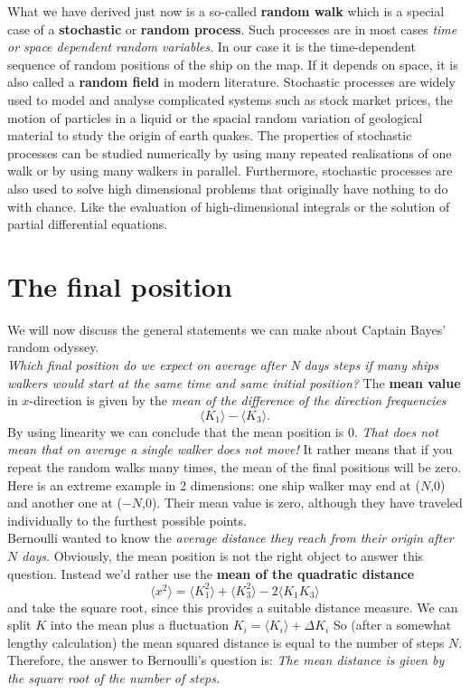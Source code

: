 \documentclass[12pt, a4paper]{scrartcl}
\begin{document}
What we have derived just now is a so-called \textbf{random walk} which is a special case of a \textbf{stochastic} or \textbf{random process}. Such processes are in most cases \textit{time or space dependent random variables}. In our case it is the time-dependent sequence of random positions of the ship on the map. If it depends on space, it is also called a \textbf{random field} in modern literature.
Stochastic processes are widely used to model and analyse complicated systems such as stock market prices, the motion of particles in a liquid or the spacial random variation of geological material to study the origin of earth quakes.
The properties of stochastic processes can be studied numerically by using many repeated realisations of one walk or by using many walkers in parallel.
Furthermore, stochastic processes are also used to solve high dimensional problems that originally have nothing to do with chance.  Like the evaluation of high-dimensional integrals or the solution of partial differential equations.\\

\section*{The final position}
We will now discuss the general statements we can make about Captain Bayes' random odyssey.\\
\textit{Which final position do we expect on average after N days steps if many ships walkers would start at the same time and same initial position?}
The \textbf{mean value} in $x$-direction is given by the \textit{mean of the difference of the direction frequencies} \[\langle K_1\rangle-\langle K_3\rangle.\] By using linearity we can conclude that the mean position is 0. 
\textit{That does not mean that on average a single walker does not move!}
It rather means that if you repeat the random walks many times, the mean of the final positions will be zero. 
Here is an extreme example in 2 dimensions: one ship walker may end at ($N$,0) and another one at ($-N$,0). Their mean value is zero, although they have traveled individually to the furthest possible points.\\
Bernoulli wanted to know the \textit{average distance they reach from their origin after $N$ days}. Obviously, the mean position is not the right object to answer this question. Instead we’d rather use the \textbf{mean of the quadratic distance} \[\langle x^2\rangle = \langle K_1^2\rangle + \langle K_3^2\rangle-2\langle K_1K_3\rangle\] and take the square root, since this provides a suitable distance measure.
We can split $K$ into the mean plus a fluctuation $K_i=\langle K_i\rangle +\Delta K_i$
So (after a somewhat lengthy calculation) the mean squared distance is equal to the number of steps $N$.
Therefore, the answer to Bernoulli's question is: 
\textit{The mean distance is given by the square root of the number of steps.}\\
\end{document}
